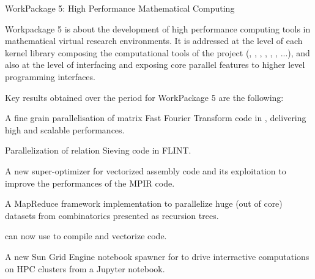 \documentclass{deliverablereport}
\makeatletter
\renewcommand\subsubsection{\@startsection{subsubsection}{2}%
  \z@{.5\linespacing\@plus.7\linespacing}{.1\linespacing}%
  {\normalfont\bfseries}}
\makeatother
\begin{document}

\clearpage
  \subsubsection{WorkPackage 5: High Performance Mathematical Computing}
\label{wp5}

  Workpackage 5 is about the development of high performance computing tools in
  mathematical virtual research environments. It is addressed at the level
  of each kernel library composing the computational tools of the project (\Pari,
  \GAP, \Linbox, \MPIR, \Sage, \Singular, ...), and also at the level of interfacing and exposing
  core parallel features to higher level programming interfaces.

  Key results obtained over the period for WorkPackage 5 are the following:
  \begin{compactitem}
  \item A fine grain parallelisation of matrix Fast Fourier Transform code in
    \FLINT, delivering high and scalable performances.
  \item Parallelization of relation  Sieving code in FLINT.
  \item A new super-optimizer for vectorized assembly code and its
    exploitation to improve the performances of the MPIR code.
  \item A MapReduce framework implementation to parallelize huge (out of core) datasets from
    combinatorics presented as recursion trees.
  \item \Cython can now use \Pythran to compile and vectorize \Numpy code.
  \item A new Sun Grid Engine notebook spawner for \Jupyter to drive
    interractive computations on HPC clusters from a Jupyter notebook.
  \end{compactitem}

\paragraph{}
\end{document}
